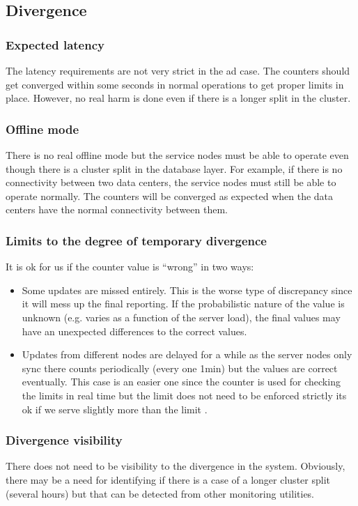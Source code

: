 \documentclass[11pt,a4paper]{report}
\begin{document}
\subsection{Divergence}
\subsubsection{Expected latency}
The latency requirements are not very strict in the ad case. The counters should get converged within some seconds in normal operations to get proper limits in place. However, no real harm is done even if there is a longer split in the cluster.

\subsubsection{Offline mode}
There is no real offline mode but the service nodes must be able to operate even though there is a cluster split in the database layer. For example, if there is no connectivity between two data centers, the service nodes must still be able to operate normally. The counters will be converged as expected when the data centers have the normal connectivity between them.

\subsubsection{Limits to the degree of temporary divergence}
It is ok for us if the counter value is ``wrong'' in two ways:
\begin{itemize}
\item Some updates are missed entirely. This is the worse type of discrepancy since it will mess up the final reporting. If the probabilistic nature of the value is unknown (e.g. varies as a function of the server load), the final values may have an unexpected differences to the correct values.
\item Updates from different nodes are delayed  for a while as the server nodes only sync there counts periodically (every one 1min) but the values are correct eventually. This case is an easier one since the counter is used for checking the limits in real time but the limit does not need to be enforced strictly its ok if we serve slightly more than the limit .
\end{itemize}

\subsubsection{Divergence visibility}
There does not need to be visibility to the divergence in the system. Obviously, there may be a need for identifying if there is a case of a longer cluster split (several hours) but that can be detected from other monitoring utilities.
\end{document}
